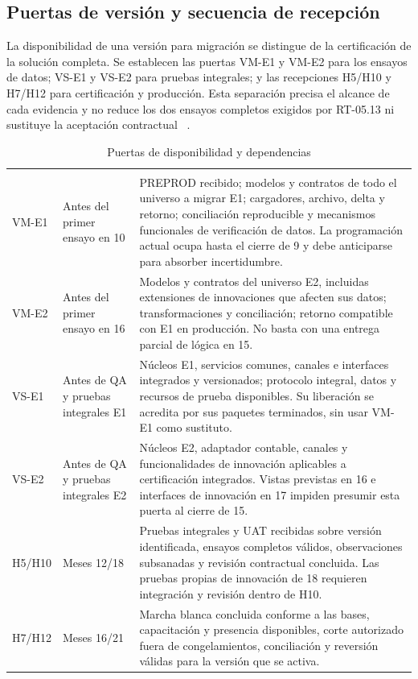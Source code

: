\subsection{Puertas de versión y secuencia de recepción}
La disponibilidad de una versión para migración se distingue de la certificación de la solución completa. Se establecen las puertas VM-E1 y VM-E2 para los ensayos de datos; VS-E1 y VS-E2 para pruebas integrales; y las recepciones H5/H10 y H7/H12 para certificación y producción. Esta separación precisa el alcance de cada evidencia y no reduce los dos ensayos completos exigidos por RT-05.13 ni sustituye la aceptación contractual \parencite[RT-05.13; pp.~11--13]{bases-transversales}~\parencite[art.~18; Formulario~E-25; pp.~13--74]{bases-admin}.

\begin{longtable}{L{21mm}L{23mm}L{107mm}}
\caption{Puertas de disponibilidad y dependencias}\label{tab:sd7-puertas-version}\\\hline
  &  & \\\hline\endfirsthead
\hline {} &  & \\\hline\endhead
VM-E1 & Antes del primer ensayo en 10 & PREPROD recibido; modelos y contratos de todo el universo a migrar E1; cargadores, archivo, delta y retorno; conciliación reproducible y mecanismos funcionales de verificación de datos. La programación actual ocupa hasta el cierre de 9 y debe anticiparse para absorber incertidumbre.\\\hline
VM-E2 & Antes del primer ensayo en 16 & Modelos y contratos del universo E2, incluidas extensiones de innovaciones que afecten sus datos; transformaciones y conciliación; retorno compatible con E1 en producción. No basta con una entrega parcial de lógica en 15.\\\hline
VS-E1 & Antes de QA y pruebas integrales E1 & Núcleos E1, servicios comunes, canales e interfaces integrados y versionados; protocolo integral, datos y recursos de prueba disponibles. Su liberación se acredita por sus paquetes terminados, sin usar VM-E1 como sustituto.\\\hline
VS-E2 & Antes de QA y pruebas integrales E2 & Núcleos E2, adaptador contable, canales y funcionalidades de innovación aplicables a certificación integrados. Vistas previstas en 16 e interfaces de innovación en 17 impiden presumir esta puerta al cierre de 15.\\\hline
H5/H10 & Meses 12/18 & Pruebas integrales y UAT recibidas sobre versión identificada, ensayos completos válidos, observaciones subsanadas y revisión contractual concluida. Las pruebas propias de innovación de 18 requieren integración y revisión dentro de H10.\\\hline
H7/H12 & Meses 16/21 & Marcha blanca concluida conforme a las bases, capacitación y presencia disponibles, corte autorizado fuera de congelamientos, conciliación y reversión válidas para la versión que se activa.\\\hline
\end{longtable}
